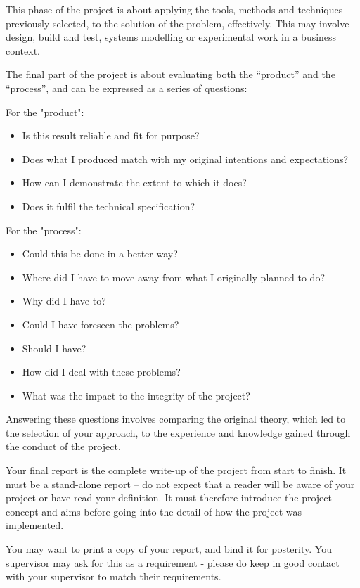 This phase of the project is about applying the tools, methods and techniques previously selected, to the solution of the problem, effectively. This may involve design, build and test, systems modelling or experimental work in a business context.

The final part of the project is about evaluating both the “product” and the “process”, and can be expressed as a series of questions:

For the "product":

\begin{itemize}
    \item Is this result reliable and fit for purpose?
    \item Does what I produced match with my original intentions and expectations?
    \item How can I demonstrate the extent to which it does? 
    \item Does it fulfil the technical specification?
\end{itemize}

For the "process":

\begin{itemize}
    \item Could this be done in a better way?
    \item Where did I have to move away from what I originally planned to do?
    \item Why did I have to? 
    \item Could I have foreseen the problems?
    \item Should I have?
    \item How did I deal with these problems? 
    \item What was the impact to the integrity of the project?
\end{itemize}

Answering these questions involves comparing the original theory, which led to the selection of your approach, to the experience and knowledge gained through the conduct of the project.

Your final report is the complete write-up of the project from start to finish. It must be a stand-alone
report – do not expect that a reader will be aware of your project or have read your definition. It
must therefore introduce the project concept and aims before going into the detail of how the project
was implemented.

\begin{tcolorbox}
    You may want to print a copy of your report, and bind it for posterity. You supervisor may ask for this as a requirement - please do keep in good contact with your supervisor to match their requirements. 
\end{tcolorbox}

